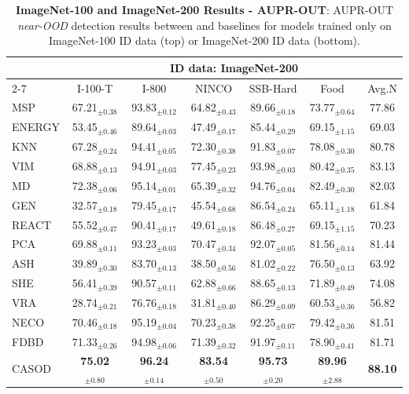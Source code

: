 \begin{table}[t!]
{\begin{tabular}{|l|ccccc|c|}
			\multirow{2}{*}{} &  \multicolumn{6}{c|}{ID data: ImageNet-200}  \\ \cline{2-7}
			& I-100-T & I-800  & NINCO & SSB-Hard & Food & Avg.N\\ \hline
            MSP    & 67.21$_{\pm 0.38}$ & 93.83$_{\pm 0.12}$ & 64.82$_{\pm 0.43}$ & 89.66$_{\pm 0.18}$ & 73.77$_{\pm 0.64}$ & 77.86  \\
ENERGY & 53.45$_{\pm 0.46}$ & 89.64$_{\pm 0.03}$ & 47.49$_{\pm 0.17}$ & 85.44$_{\pm 0.29}$ & 69.15$_{\pm 1.15}$ & 69.03  \\
KNN    & 67.28$_{\pm 0.24}$ & 94.41$_{\pm 0.05}$ & 72.30$_{\pm 0.38}$ & 91.83$_{\pm 0.07}$ & 78.08$_{\pm 0.30}$ & 80.78  \\
VIM    & 68.88$_{\pm 0.13}$ & 94.91$_{\pm 0.03}$ & 77.45$_{\pm 0.23}$ & 93.98$_{\pm 0.03}$ & 80.42$_{\pm 0.35}$ & 83.13  \\
MD     & 72.38$_{\pm 0.06}$ & 95.14$_{\pm 0.01}$ & 65.39$_{\pm 0.32}$ & 94.76$_{\pm 0.04}$ & 82.49$_{\pm 0.30}$ & 82.03  \\
GEN    & 32.57$_{\pm 0.18}$ & 79.45$_{\pm 0.17}$ & 45.54$_{\pm 0.68}$ & 86.54$_{\pm 0.24}$ & 65.11$_{\pm 1.18}$ & 61.84 \\
REACT  & 55.52$_{\pm 0.47}$ & 90.41$_{\pm 0.17}$ & 49.61$_{\pm 0.18}$ & 86.48$_{\pm 0.27}$ & 69.15$_{\pm 1.15}$ & 70.23 \\
PCA    & 69.88$_{\pm 0.11}$ & 93.23$_{\pm 0.03}$ & 70.47$_{\pm 0.34}$ & 92.07$_{\pm 0.05}$ & 81.56$_{\pm 0.14}$ & 81.44 \\
ASH    & 39.89$_{\pm 0.30}$ & 83.70$_{\pm 0.13}$ & 38.50$_{\pm 0.56}$ & 81.02$_{\pm 0.22}$ & 76.50$_{\pm 0.13}$ & 63.92 \\
SHE    & 56.41$_{\pm 0.39}$ & 90.57$_{\pm 0.11}$ & 62.88$_{\pm 0.66}$ & 88.65$_{\pm 0.13}$ & 71.89$_{\pm 0.49}$ & 74.08  \\
VRA    & 28.74$_{\pm 0.21}$ & 76.76$_{\pm 0.18}$ & 31.81$_{\pm 0.40}$ & 86.29$_{\pm 0.09}$ & 60.53$_{\pm 0.36}$ & 56.82  \\
NECO   & 70.46$_{\pm 0.18}$ & 95.19$_{\pm 0.04}$ & 70.23$_{\pm 0.38}$ & 92.25$_{\pm 0.07}$ & 79.42$_{\pm 0.36}$ & 81.51 \\
FDBD   & 71.33$_{\pm 0.26}$ & 94.98$_{\pm 0.06}$ & 71.39$_{\pm 0.32}$ & 91.97$_{\pm 0.11}$ & 78.90$_{\pm 0.41}$ & 81.71 \\ \hline
CASOD  & \textbf{75.02}$_{\pm 0.80}$ & \textbf{96.24}$_{\pm 0.14}$ & \textbf{83.54}$_{\pm 0.50}$ & \textbf{95.73}$_{\pm 0.20}$ & \textbf{89.96}$_{\pm 2.88}$ & \textbf{88.10}  \\ \hline
		\end{tabular}
	}
	\caption{\textbf{ImageNet-100 and ImageNet-200 Results - AUPR-OUT}: AUPR-OUT \textit{near-OOD} detection results between \sys and baselines for models trained only on ImageNet-100 ID data (top) or ImageNet-200 ID data (bottom).
	}
	\label{tab:table_ood_auprout}
\end{table}

